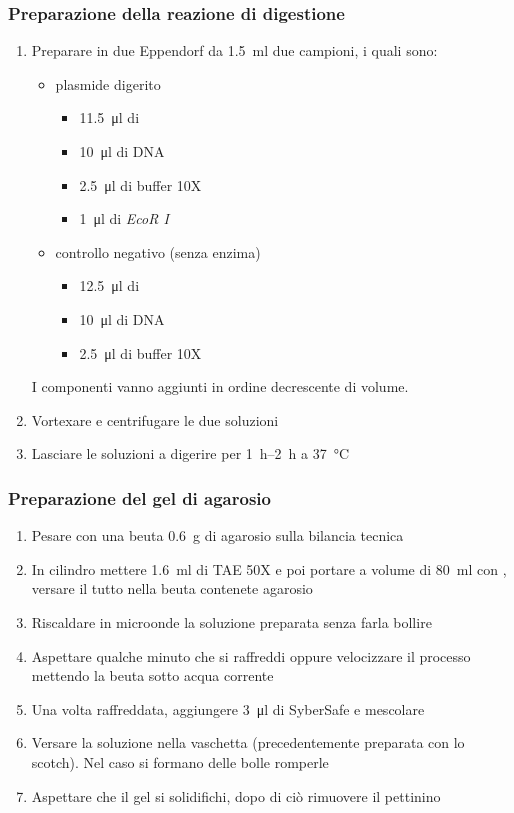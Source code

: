 \subsubsection{Preparazione della reazione di digestione}
\begin{enumerate}
	\item Preparare in due \foreignlanguage{german}{Eppendorf} da \qty{1.5}{\ml} due campioni, i quali sono:
	\begin{itemize}
		\item plasmide digerito
		\begin{itemize}
			\item \qty{11.5}{\micro\litre} di 
			\item \qty{10}{\micro\litre} di DNA
			\item \qty{2.5}{\micro\litre} di buffer 10X
			\item \qty{1}{\micro\litre} di \emph{EcoR I}
		\end{itemize}
		\item controllo negativo (senza enzima)
		\begin{itemize}
			\item \qty{12.5}{\micro\litre} di 
			\item \qty{10}{\micro\litre} di DNA
			\item \qty{2.5}{\micro\litre} di buffer 10X
		\end{itemize}
	\end{itemize}
	I componenti vanno aggiunti in ordine decrescente di volume.
	\item Vortexare e centrifugare le due soluzioni
	\item Lasciare le soluzioni a digerire per \qtyrange{1}{2}{\hour} a \qty{37}{\celsius}
\end{enumerate}

\subsubsection{Preparazione del gel di agarosio}\label{sssec:agarosio}
\begin{enumerate}
	\item Pesare con una beuta \qty{0.6}{\g} di agarosio sulla bilancia tecnica 
	\item In cilindro mettere \qty{1.6}{\ml} di TAE 50X e poi portare a volume di \qty{80}{\ml} con , versare il tutto nella beuta contenete agarosio
	\item Riscaldare in microonde la soluzione preparata senza farla bollire
	\item Aspettare qualche minuto che si raffreddi oppure velocizzare il processo mettendo la beuta sotto acqua corrente
	\item Una volta raffreddata, aggiungere \qty{3}{\micro\litre} di SyberSafe e mescolare
	\item Versare la soluzione nella vaschetta (precedentemente preparata con lo scotch). Nel caso si formano delle bolle romperle
	\item Aspettare che il gel si solidifichi, dopo di ciò rimuovere il pettinino
\end{enumerate}


